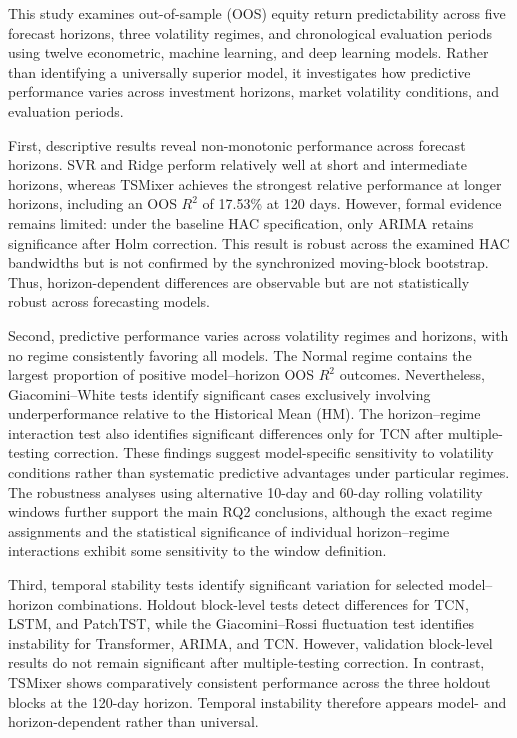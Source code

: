 \documentclass[12pt,twoside]{ord}
\begin{document}
This study examines out-of-sample (OOS) equity return predictability across five forecast horizons, three volatility regimes, and chronological evaluation periods using twelve econometric, machine learning, and deep learning models. Rather than identifying a universally superior model, it investigates how predictive performance varies across investment horizons, market volatility conditions, and evaluation periods.

First, descriptive results reveal non-monotonic performance across forecast horizons. SVR and Ridge perform relatively well at short and intermediate horizons, whereas TSMixer achieves the strongest relative performance at longer horizons, including an OOS $R^2$ of 17.53\% at 120 days. However, formal evidence remains limited: under the baseline HAC specification, only ARIMA retains significance after Holm correction. This result is robust across the examined HAC bandwidths but is not confirmed by the synchronized moving-block bootstrap. Thus, horizon-dependent differences are observable but are not statistically robust across forecasting models.

Second, predictive performance varies across volatility regimes and horizons, with no regime consistently favoring all models. The Normal regime contains the largest proportion of positive model--horizon OOS $R^2$ outcomes. Nevertheless, Giacomini--White tests identify significant cases exclusively involving underperformance relative to the Historical Mean (HM). The horizon--regime interaction test also identifies significant differences only for TCN after multiple-testing correction. These findings suggest model-specific sensitivity to volatility conditions rather than systematic predictive advantages under particular regimes. The robustness analyses using alternative 10-day and 60-day rolling volatility windows further support the main RQ2 conclusions, although the exact regime assignments and the statistical significance of individual horizon--regime interactions exhibit some sensitivity to the window definition.

Third, temporal stability tests identify significant variation for selected model--horizon combinations. Holdout block-level tests detect differences for TCN, LSTM, and PatchTST, while the Giacomini--Rossi fluctuation test identifies instability for Transformer, ARIMA, and TCN. However, validation block-level results do not remain significant after multiple-testing correction. In contrast, TSMixer shows comparatively consistent performance across the three holdout blocks at the 120-day horizon. Temporal instability therefore appears model- and horizon-dependent rather than universal.
\end{document}
